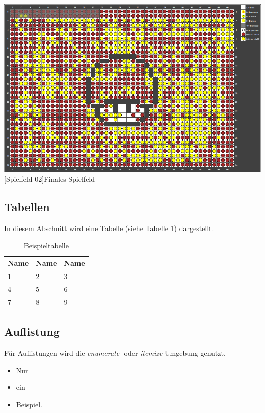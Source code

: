 \documentclass[12pt,a4paper,bibliography=totocnumbered,listof=totocnumbered]{scrartcl}
\begin{document}
\vspace{1em}
\begin{minipage}{\linewidth}
	\centering
	\includegraphics[width=0.6\linewidth]{pics/gamefield02.png}
	[Spielfeld 02]{Finales Spielfeld\footnotemark }
	\label{fig:reversi2}
\end{minipage}

\subsection{Tabellen}
In diesem Abschnitt wird eine Tabelle (siehe Tabelle \ref{tab:beispiel}) dargestellt.

\vspace{1em}
\begin{table}[!h]
	\centering
	\begin{tabular}{|l|l|l|}
		\hline
		\textbf{Name} & \textbf{Name} & \textbf{Name}\\
		\hline
		1 & 2 & 3\\
		\hline
		4 & 5 & 6\\
		\hline
		7 & 8 & 9\\
		\hline
	\end{tabular}
	\caption{Beispieltabelle}
	\label{tab:beispiel}
\end{table}


\subsection{Auflistung}
Für Auflistungen wird die \textit{enumerate}- oder \textit{itemize}-Umgebung genutzt.

\begin{itemize}
	\item Nur
	\item ein
	\item Beispiel.
\end{itemize}
\end{document}

